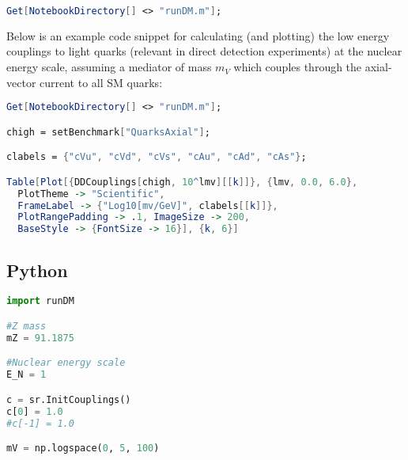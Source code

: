 \documentclass[notitlepage,12pt]{article}
\begin{document}
\begin{lstlisting}[language=mathematica]
Get[NotebookDirectory[] <> "runDM.m"];
\end{lstlisting}

Below is an example code snippet for calculating (and plotting) the low energy couplings to light quarks (relevant in direct detection experiments) at the nuclear energy scale, assuming a mediator of mass $m_V$ which couples through the axial-vector current to all SM quarks:

\begin{lstlisting}[language=mathematica]
Get[NotebookDirectory[] <> "runDM.m"];

chigh = setBenchmark["QuarksAxial"];

clabels = {"cVu", "cVd", "cVs", "cAu", "cAd", "cAs"};

Table[Plot[{DDCouplings[chigh, 10^lmv][[k]]}, {lmv, 0.0, 6.0}, 
  PlotTheme -> "Scientific", 
  FrameLabel -> {"Log10[mv/GeV]", clabels[[k]]}, 
  PlotRangePadding -> .1, ImageSize -> 200, 
  BaseStyle -> {FontSize -> 16}], {k, 6}]
\end{lstlisting}


\subsection{Python}

\begin{lstlisting}[language=Python]
import runDM

#Z mass
mZ = 91.1875

#Nuclear energy scale
E_N = 1

c = sr.InitCouplings()
c[0] = 1.0
#c[-1] = 1.0

mV = np.logspace(0, 5, 100)
\end{lstlisting}
\end{document}
